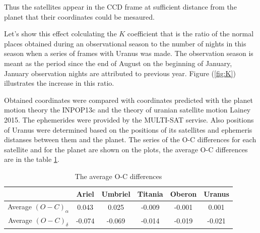 \documentclass[]{article}
\begin{document}
 Thus the satellites appear in the CCD frame at sufficient distance from the planet that their coordinates could be mesaured.\par
Let's show this effect colculating the $K$ coefficient that is the ratio of the normal places obtained during an observational season to the number of nights in this season when a series of frames with Uranus was made. The observation season is meant as the period since the end of August on the beginning of January, January observation nights are attributed to previous year. Figure (\ref{fig:K}) illustrates the increase in this ratio.\par


Obtained coordinates were compared with coordinates predicted with the planet motion theory the INPOP13c and the theory of uranian satellite motion Lainey 2015. The ephemerides were provided by the MULTI-SAT servise\cite{5}. Also positions of Uranus were determined based on the positions of its satellites and ephemeris distanses between them and the planet.  The series of the O-C differences for each satellite and for the planet are shown on the plots, the average O-C differences are in the table \ref{mean_OC}.

\begin{table}
\begin{center}
\caption{The average O-C differences}
\label{mean_OC}
\begin{tabular}{|c|c|c|c|c|c|}
\hline
& Ariel&Umbriel&Titania& Oberon & Uranus \\
\hline
Average $(O-C)_\alpha$ & 0.043 & 0.025 & -0.009 & -0.001 & 0.001\\
Average $(O-C)_\delta$ & -0.074 & -0.069 & -0.014 & -0.019 & -0.021\\
\hline
\end{tabular}
\end{center}
\end{table}
\end{document}
